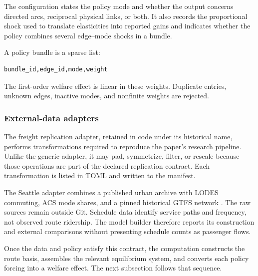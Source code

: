 The configuration states the policy mode and whether the output concerns
directed arcs, reciprocal physical links, or both. It also records the
proportional shock used to translate elasticities into reported gains and
indicates whether the policy combines several edge--mode shocks in a bundle.

A policy bundle is a sparse list:
\begin{lstlisting}
bundle_id,edge_id,mode,weight
\end{lstlisting}
The first-order welfare effect is linear in these weights. Duplicate entries,
unknown edges, inactive modes, and nonfinite weights are rejected.

\subsubsection{External-data adapters}

The freight replication adapter, retained in code under its historical
 name, performs transformations required to reproduce the paper's
research pipeline. Unlike the generic adapter, it may pad, symmetrize, filter,
or rescale because those operations are part of the declared replication
contract. Each transformation is listed in TOML and written to the manifest.

The Seattle adapter combines a published urban archive with LODES commuting,
ACS mode shares, and a pinned historical GTFS network
\citep{CensusLODES,CensusACS2017B08301,KingCountyGTFS2017}. The raw sources
remain outside Git. Schedule data identify service paths and frequency, not
observed route ridership. The model builder therefore reports its construction
and external comparisons without presenting schedule counts as passenger
flows.


Once the data and policy satisfy this contract, the computation constructs the
route basis, assembles the relevant equilibrium system, and converts each
policy forcing into a welfare effect. The next subsection follows that
sequence.
